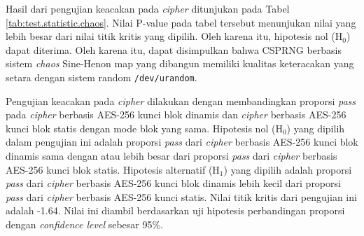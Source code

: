 Hasil dari pengujian keacakan pada \emph{cipher} ditunjukan pada Tabel \ref{tab:test.statistic.chaos}. Nilai P-value pada tabel tersebut menunjukan nilai yang lebih besar dari nilai titik kritis yang dipilih. Oleh karena itu, hipotesis nol ($\text{H}_0$) dapat diterima. Oleh karena itu, dapat disimpulkan bahwa CSPRNG berbasis sistem \emph{chaos} Sine-Henon map yang dibangun memiliki kualitas keteracakan yang setara dengan sistem random \texttt{/dev/urandom}.

Pengujian keacakan pada \emph{cipher} dilakukan dengan membandingkan proporsi \emph{pass} pada \emph{cipher} berbasis AES-256 kunci blok dinamis dan \emph{cipher} berbasis AES-256 kunci blok statis dengan mode blok yang sama. Hipotesis nol ($\text{H}_0$) yang dipilih dalam pengujian ini adalah proporsi \emph{pass} dari \emph{cipher} berbasis AES-256 kunci blok dinamis sama dengan atau lebih besar dari proporsi \emph{pass} dari \emph{cipher} berbasis AES-256 kunci blok statis. Hipotesis alternatif ($\text{H}_1$) yang dipilih adalah proporsi \emph{pass} dari \emph{cipher} berbasis AES-256 kunci blok dinamis lebih kecil dari proporsi \emph{pass} dari \emph{cipher} berbasis AES-256 kunci statis. Nilai titik kritis dari pengujian ini adalah -1.64. Nilai ini diambil berdasarkan uji hipotesis perbandingan proporsi dengan \emph{confidence level} sebesar 95\%.

